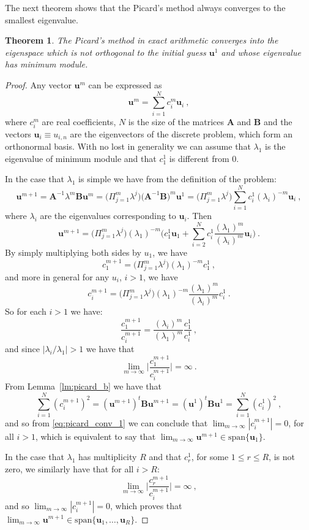 \documentclass[preprint ,12pt]{elsarticle}
\newtheorem{theorem}{Theorem}[section]
\begin{document}
The next theorem shows that the Picard's method always converges to the smallest eigenvalue.

\begin{theorem}\label{th:picard_conv}
The Picard's method in exact arithmetic converges into the eigenspace which is not orthogonal to the initial guess $\mathbf{u}^1$ and whose eigenvalue has minimum module.
\end{theorem}

\begin{proof}
Any vector $\mathbf{u}^m$ can be expressed as 
$$
\mathbf{u}^m=\sum_{i=1}^N c_i^m \mathbf{u}_i\ ,
$$
where $c_i^m$ are real coefficients, $N$ is the size of the matrices $\mathbf{A}$ and $\mathbf{B}$ and the vectors $\mathbf{u}_i\equiv u_{i,n}$ are the eigenvectors of the discrete problem, which form an orthonormal basis.
With no lost in generality we can assume that $\lambda_1$ is the eigenvalue of minimum module and that $c_1^1$ is different from 0.

In the case that $\lambda_1$ is simple we have from the definition of the problem:
$$
\mathbf{u}^{m+1}=\mathbf{A}^{-1}\lambda^m\mathbf{B}\mathbf{u}^{m}
=\Big(\Pi_{j=1}^m\lambda^{j}\Big)\Big(\mathbf{A}^{-1}\mathbf{B}\Big)^m\mathbf{u}^1
=\Big(\Pi_{j=1}^m\lambda^{j}\Big)\sum_{i=1}^N c_i^1 (\lambda_i)^{-m}\mathbf{u}_i\ ,
$$
where $\lambda_i$ are the eigenvalues corresponding to $\mathbf{u}_i$.
Then
$$
\mathbf{u}^{m+1}=\Big(\Pi_{j=1}^m\lambda^{j}\Big)(\lambda_1)^{-m}\Big( c_1^1 \mathbf{u}_1 +
\sum_{i=2}^N c_i^1\frac{(\lambda_1)^m}{(\lambda_i)^{m}}\mathbf{u}_i\Big) \ .
$$
By simply multiplying both sides by $u_1$, we have
$$
c_1^{m+1}=\Big(\Pi_{j=1}^m\lambda^{j}\Big)(\lambda_1)^{-m}c_1^1\ ,
$$
and more in general for any $u_i$, $i>1$, we have
$$
c_i^{m+1}=\Big(\Pi_{j=1}^m\lambda^{j}\Big)(\lambda_1)^{-m}\frac{(\lambda_1)^m}{(\lambda_i)^{m}}c_i^1\ .
$$
So for each $i>1$ we have:
$$
\frac{c_1^{m+1}}{c_i^{m+1}}=\frac{(\lambda_i)^m}{(\lambda_1)^{m}}\frac{c_1^1}{c_i^1}\ ,
$$
and since $|\lambda_i/\lambda_1|>1$ we have that
\begin{equation}\label{eq:picard_conv_1}
\lim_{m\rightarrow \infty}\Big\vert\frac{c_1^{m+1}}{c_i^{m+1}}\Big\vert= \infty\ .
\end{equation}
From Lemma~\ref{lm:picard_b} we have that
$$
\sum_{i=1}^N (c_i^{m+1})^2 = (\mathbf{u}^{m+1})^t\mathbf{B}\mathbf{u}^{m+1}
=(\mathbf{u}^1)^t\mathbf{B}\mathbf{u}^1=\sum_{i=1}^N (c_i^1)^2\ ,
$$
and so from \eqref{eq:picard_conv_1} we can conclude that $\lim_{m\rightarrow \infty}|c_i^{m+1}|=0$, for all $i>1$, which is equivalent to say that $\lim_{m\rightarrow \infty}\mathbf{u}^{m+1}\in \mathrm{span}\{\mathbf{u}_1\}$.

In the case that $\lambda_1$ has multiplicity $R$ and that $c_r^1$, for some $1\leq r\leq R$, is not zero,
we similarly have that for all $i>R$:
$$
\lim_{m\rightarrow \infty}\Big\vert\frac{c_r^{m+1}}{c_i^{m+1}}\Big\vert= \infty\ ,
$$
and so $\lim_{m\rightarrow \infty}|c_i^{m+1}|=0$, which proves that $\lim_{m\rightarrow \infty}\mathbf{u}^{m+1}\in \mathrm{span}\{\mathbf{u}_1,\dots,\mathbf{u}_R\}$.

\end{proof}
\end{document}
